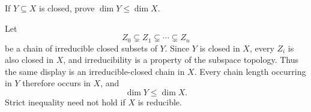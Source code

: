\begin{problem}\label{prob:vi30-05}
If \(Y\subseteq X\) is closed, prove \(\dim Y\leq\dim X\).

\end{problem}

\ifdefined\FullProblemDossiers
\begin{solution}
Let
\[
Z_0\subsetneq Z_1\subsetneq\cdots\subsetneq Z_n
\]
be a chain of irreducible closed subsets of \(Y\). Since \(Y\) is closed in \(X\), every \(Z_i\) is also closed in
\(X\), and irreducibility is a property of the subspace topology. Thus the same display is an irreducible-closed
chain in \(X\). Every chain length occurring in \(Y\) therefore occurs in \(X\), and
\[
\boxed{\dim Y\le\dim X}.
\]
Strict inequality need not hold if \(X\) is reducible.
\end{solution}
\fi
